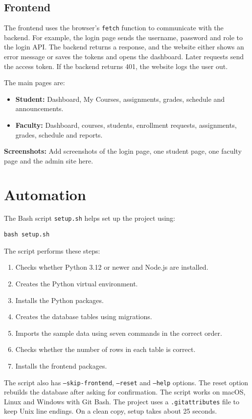 \documentclass[11pt,a4paper]{article}
\begin{document}
\subsection{Frontend}
The frontend uses the browser's \texttt{fetch} function to communicate with
the backend. For example, the login page sends the username, password and role
to the login API. The backend returns a response, and the website either shows
an error message or saves the tokens and opens the dashboard. Later requests
send the access token. If the backend returns 401, the website logs the user out.

The main pages are:
\begin{itemize}
    \item \textbf{Student:} Dashboard, My Courses, assignments, grades, schedule
    and announcements.
    \item \textbf{Faculty:} Dashboard, courses, students, enrollment requests,
    assignments, grades, schedule and reports.
\end{itemize}

\textbf{Screenshots:} Add screenshots of the login page, one student page, one
faculty page and the admin site here.

\section{Automation}

The Bash script \texttt{setup.sh} helps set up the project using:
\begin{verbatim}
bash setup.sh
\end{verbatim}

The script performs these steps:
\begin{enumerate}
    \item Checks whether Python 3.12 or newer and Node.js are installed.
    \item Creates the Python virtual environment.
    \item Installs the Python packages.
    \item Creates the database tables using migrations.
    \item Imports the sample data using seven commands in the correct order.
    \item Checks whether the number of rows in each table is correct.
    \item Installs the frontend packages.
\end{enumerate}

The script also has \texttt{--skip-frontend}, \texttt{--reset} and
\texttt{--help} options. The reset option rebuilds the database after asking
for confirmation. The script works on macOS, Linux and Windows with Git Bash.
The project uses a \texttt{.gitattributes} file to keep Unix line endings.
On a clean copy, setup takes about 25 seconds.
\end{document}
